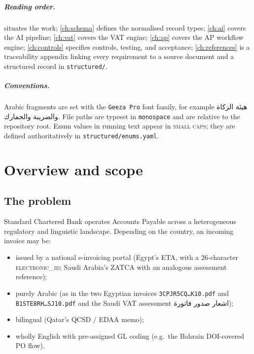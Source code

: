 \documentclass[11pt,a4paper,twoside]{report}
\newcommand{\corpus}{}
\newcommand{\ar}[1]{\foreignlanguage{arabic}{#1}}
\begin{document}
\paragraph{Reading order.}  situates the work;
\cref{ch:schema} defines the normalised record types; \cref{ch:ai} covers
the AI pipeline; \cref{ch:vat} covers the VAT engine; \cref{ch:ap}
covers the AP workflow engine; \cref{ch:controls} specifies controls,
testing, and acceptance; \cref{ch:references} is a traceability
appendix linking every requirement to a source document and a structured
record in \corpus\texttt{structured/}.

\paragraph{Conventions.} Arabic fragments are set with the
\texttt{Geeza Pro} font family, for example \ar{هيئة الزكاة والضريبة والجمارك}.
File paths are typeset in \texttt{monospace} and are relative to the
repository root. Enum values in running text appear in \textsc{small
caps}; they are defined authoritatively in
\corpus\texttt{structured/enums.yaml}.
\chapter{Overview and scope}\label{ch:overview}

\section{The problem}

Standard Chartered Bank operates Accounts Payable across a heterogeneous
regulatory and linguistic landscape. Depending on the country, an
incoming invoice may be:

\begin{itemize}
\item issued by a national e-invoicing portal (Egypt's ETA, with a
26-character \textsc{electronic\_id}; Saudi Arabia's ZATCA with
an analogous assessment reference);
\item purely Arabic (as in the two Egyptian invoices
\texttt{3CPJR5CQ\ldots K10.pdf} and \texttt{B1STE8RH\ldots SJ10.pdf}
and the Saudi VAT assessment \ar{اشعار صدور فاتورة});
\item bilingual (Qatar's QCSD / EDAA memo);
\item wholly English with pre-assigned GL coding (e.g.\ the Bahrain
DOI-covered PO flow).
\end{itemize}
\end{document}
